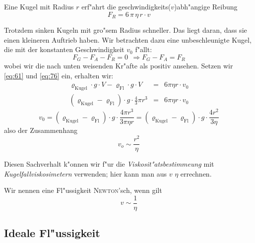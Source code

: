 \begin{Wichtig}
Eine Kugel mit Radius $r$ erf"ahrt die geschwindigkeits($v$)abh"angige Reibung
\begin{equation}
   \label{eq:76}
   F_R = 6 \, \pi \, \eta \, r \cdot v
\end{equation}
\end{Wichtig}
Trotzdem sinken Kugeln mit gro"sem Radius schneller. Das liegt daran,
dass sie einen kleineren Auftrieb haben. Wir betrachten dazu eine
unbeschleunigte Kugel, die mit der konstanten Geschwindigkeit $v_0$ f"allt:
$$
F_G - F_A - F_R = 0 ~ ~\Rightarrow F_G - F_A = F_R
$$
wobei wir die nach unten weisenden Kr"afte als positiv ansehen. Setzen
wir \eqref{eq:61} und \eqref{eq:76} ein, erhalten wir:
\begin{eqnarray*}
   \label{eq:77}
   \varrho_\text{Kugel} \cdot g \cdot V - \varrho_\text{Fl} \cdot g
   \cdot V &=& 6\pi\eta r \cdot v_0 \\
   (\varrho_\text{Kugel} - \varrho_\text{Fl}) \cdot g
   \cdot \frac{4}{3}\pi r^3  &=& 6\pi\eta r \cdot v_0 
\end{eqnarray*}
\begin{equation}
   \label{eq:78}
   v_0 =  (\varrho_\text{Kugel} - \varrho_\text{Fl}) \cdot g \cdot
\frac{4 \pi r^3}{3 \pi \eta r} = (\varrho_\text{Kugel} -
\varrho_\text{Fl}) \cdot g \cdot \frac{4 r^2}{3 \eta}
\end{equation}
also der Zusammenhang
\begin{equation}
   \label{eq:79}
   v_o \sim \frac{r^2}{\eta}
\end{equation}

Diesen Sachverhalt k"onnen wir f"ur die \emph{Viskosit"atsbestimmeung} mit
\emph{Kugelfallviskosimetern} verwenden;
hier kann man aus $v$ $\eta$ errechnen.

\begin{Def}
Wir nennen eine Fl"ussigkeit \textsc{Newton}'sch, wenn gilt
\begin{equation}
   \label{eq:80}
   v \sim \frac{1}{\eta}
\end{equation}
\end{Def}









\subsection{Ideale Fl"ussigkeit}
\label{kap_ideale-flussigkeit}

